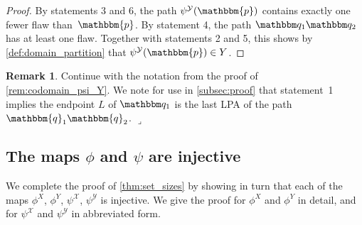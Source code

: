 \documentclass[11pt]{article}
\newcommand{\lrcornerqed}[0]{}
\renewcommand{\lrcornerqed}[0]{\hfill $\lrcorner$} %
\theoremstyle{definition} %
\numberwithin{equation}{section}
\newtheorem{remark}[thm]{Remark}
\begin{document}
\begin{proof}
    By statements 3 and 6, the path $\psi^{\mathcal Y}(\mathbbm{p})$ contains exactly one fewer flaw than~$\mathbbm{p}$. By statement 4, the path $\mathbbm q_1 \mathbbm q_2$ has at least one flaw. Together with statements 2 and 5, this shows by \cref{def:domain_partition} that $\psi^\mathcal Y(\mathbbm{p}) \in Y$.
\end{proof}


\begin{remark}
\label{rem:remark_after_psi_Y_well-defined}
    Continue with the notation from the proof of \cref{rem:codomain_psi_Y}.
    We note for use in \cref{subsec:proof} that statement~1 implies the endpoint $L$ of $\mathbbm q_1$ is the last LPA of the path $\mathbbm{q}_1 \mathbbm{q}_2$. \lrcornerqed
\end{remark}

\subsection{The maps \texorpdfstring{$\phi$}{phi} and \texorpdfstring{$\psi$}{psi} are injective}
\label{subsec:proof}

We complete the proof of \cref{thm:set_sizes} by showing in turn that each of the maps $\phi^X$, $\phi^Y$, $\psi^{\mathcal{X}}$, $\psi^{\mathcal{Y}}$ is injective.
We give the proof for $\phi^X$ and $\phi^Y$ in detail, and for $\psi^{\mathcal{X}}$ and $\psi^{\mathcal{Y}}$ in abbreviated form.
\end{document}
